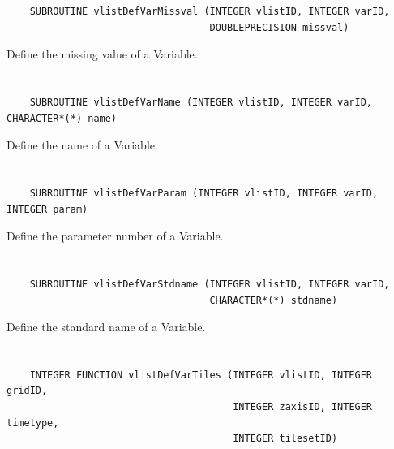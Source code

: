 \begin{verbatim}
    SUBROUTINE vlistDefVarMissval (INTEGER vlistID, INTEGER varID,
                                   DOUBLEPRECISION missval)
\end{verbatim}

Define the missing value of a Variable.


\section*{\tt {}}

\begin{verbatim}
    SUBROUTINE vlistDefVarName (INTEGER vlistID, INTEGER varID, CHARACTER*(*) name)
\end{verbatim}

Define the name of a Variable.


\section*{\tt {}}

\begin{verbatim}
    SUBROUTINE vlistDefVarParam (INTEGER vlistID, INTEGER varID, INTEGER param)
\end{verbatim}

Define the parameter number of a Variable.


\section*{\tt {}}

\begin{verbatim}
    SUBROUTINE vlistDefVarStdname (INTEGER vlistID, INTEGER varID,
                                   CHARACTER*(*) stdname)
\end{verbatim}

Define the standard name of a Variable.


\section*{\tt {}}

\begin{verbatim}
    INTEGER FUNCTION vlistDefVarTiles (INTEGER vlistID, INTEGER gridID,
                                       INTEGER zaxisID, INTEGER timetype,
                                       INTEGER tilesetID)
\end{verbatim}

